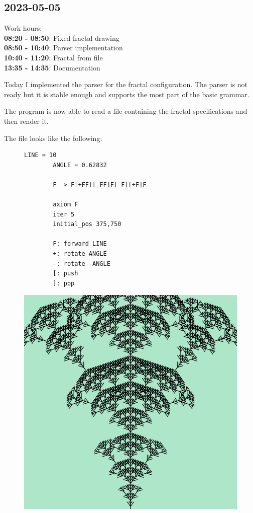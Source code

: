 \documentclass{article}
\begin{document}
\pagebreak

\subsection{2023-05-05}

Work hours:\\
\textbf{08:20 - 08:50}: Fixed fractal drawing \\
\textbf{08:50 - 10:40}: Parser implementation \\
\textbf{10:40 - 11:20}: Fractal from file \\
\textbf{13:35 - 14:35}: Documentation

Today I implemented the parser for the fractal configuration.
The parser is not ready but it is stable enough and supports the most part
of the basic grammar.

The program is now able to read a file containing the fractal specifications
and then render it.

The file looks like the following:

\begin{figure}[h]
\begin{minipage}{0.5\textwidth}
    \begin{lstlisting}[basicstyle=\ttfamily]
        LINE = 10
        ANGLE = 0.62832
    
        F -> F[+FF][-FF]F[-F][+F]F
    
        axiom F
        iter 5
        initial_pos 375,750
    
        F: forward LINE
        +: rotate ANGLE
        -: rotate -ANGLE
        [: push
        ]: pop
    \end{lstlisting}
\end{minipage}
\begin{minipage}{0.5\textwidth}
    \includegraphics[width=\textwidth]{fractal.png}
\end{minipage}
\end{figure}
\end{document}

